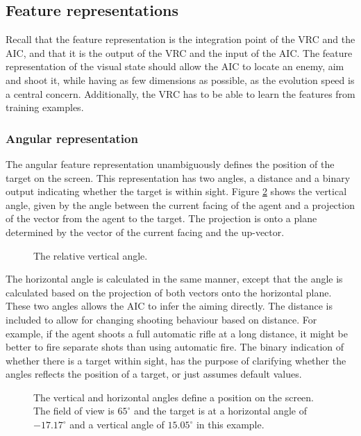 \subsection{Feature representations}
Recall that the feature representation is the integration point of the VRC and the AIC, and that it is the output of the VRC and the input of the AIC.
The feature representation of the visual state should allow the AIC to locate an enemy, aim and shoot it, while having as few dimensions as possible, as the evolution speed is a central concern. Additionally, the VRC has to be able to learn the features from training examples.

\subsubsection{Angular representation}
\label{sec:angular}
The angular feature representation unambiguously defines the position of the target on the screen. This representation has two angles, a distance and a binary output indicating whether the target is within sight. Figure \ref{fig:angular} shows the vertical angle, given by the angle between the current facing of the agent and a projection of the vector from the agent to the target. The projection is onto a plane determined by the vector of the current facing and the up-vector.
\begin{figure}[H]
    \centering
    	\begin{scriptsize}
		\sffamily
    	
    	\end{scriptsize}
    \caption[Calculation of angles]{The relative vertical angle.}
    \label{fig:angular}
\end{figure}
\noindent
The horizontal angle is calculated in the same manner, except that the angle is calculated based on the projection of both vectors onto the horizontal plane. These two angles allows the AIC to infer the aiming directly. The distance is included to allow for changing shooting behaviour based on distance. For example, if the agent shoots a full automatic rifle at a long distance, it might be better to fire separate shots than using automatic fire. The binary indication of whether there is a target within sight, has the purpose of clarifying whether the angles reflects the position of a target, or just assumes default values.
\begin{figure}[H]
    \centering
    	\begin{scriptsize}
		\sffamily
    	
    	\end{scriptsize}
    \caption[Angular representation of the visual state]{The vertical and horizontal angles define a position on the screen. The field of view is $65^\circ$ and the target is at a horizontal angle of $-17.17^\circ$ and a vertical angle of $15.05^\circ$ in this example.}
    \label{fig:angular}
\end{figure}

